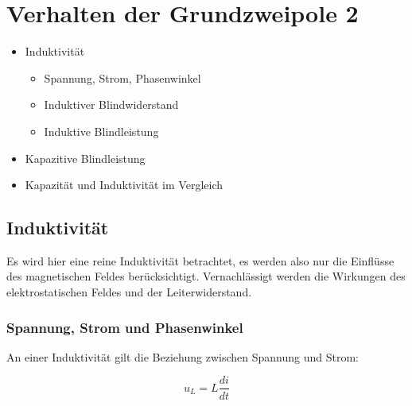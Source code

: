 \documentclass[
  ngerman,
  letterpaper,
]{scrbook}
\providecommand{\tightlist}{%
  \setlength{\itemsep}{0pt}\setlength{\parskip}{0pt}}
\begin{document}
\chapter{Verhalten der Grundzweipole
2}\label{verhalten-der-grundzweipole-2}

\begin{itemize}
\tightlist
\item
  Induktivität

  \begin{itemize}
  \tightlist
  \item
    Spannung, Strom, Phasenwinkel
  \item
    Induktiver Blindwiderstand
  \item
    Induktive Blindleistung
  \end{itemize}
\item
  Kapazitive Blindleistung
\item
  Kapazität und Induktivität im Vergleich
\end{itemize}

\section{Induktivität}\label{induktivituxe4t}

Es wird hier eine reine Induktivität betrachtet, es werden also nur die
Einflüsse des magnetischen Feldes berücksichtigt. Vernachlässigt werden
die Wirkungen des elektrostatischen Feldes und der Leiterwiderstand.

\subsection{Spannung, Strom und
Phasenwinkel}\label{spannung-strom-und-phasenwinkel-2}

An einer Induktivität gilt die Beziehung zwischen Spannung und Strom:

\begin{tcolorbox}[enhanced jigsaw, titlerule=0mm, rightrule=.15mm, toprule=.15mm, colback=white, toptitle=1mm, bottomrule=.15mm, coltitle=black, leftrule=.75mm, arc=.35mm, colbacktitle=quarto-callout-important-color!10!white, opacityback=0, bottomtitle=1mm, colframe=quarto-callout-important-color-frame, opacitybacktitle=0.6, breakable, title=\textcolor{quarto-callout-important-color}{\faExclamation}\hspace{0.5em}{Induktivität}, left=2mm]

\[
u_L = L \frac{di}{dt}
\]

\end{tcolorbox}
\end{document}
